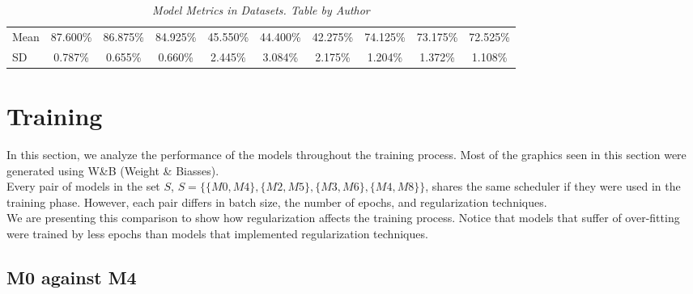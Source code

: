 \begin{landscape}
\begin{table}
\begin{tabular}{lccccccccc}
\cellcolor{gray!50}Mean & \cellcolor{gray!50}87.600\% & \cellcolor{gray!50}86.875\% & \cellcolor{gray!50}84.925\% & \cellcolor{gray!50}45.550\% & \cellcolor{gray!50}44.400\% & \cellcolor{gray!50}42.275\% & \cellcolor{gray!50}74.125\% & \cellcolor{gray!50}73.175\% & \cellcolor{gray!50}72.525\% \\
\cellcolor{gray!50}SD & \cellcolor{gray!50}0.787\% & \cellcolor{gray!50}0.655\% & \cellcolor{gray!50}0.660\% & \cellcolor{gray!50}2.445\% & \cellcolor{gray!50}3.084\% & \cellcolor{gray!50}2.175\% & \cellcolor{gray!50}1.204\% & \cellcolor{gray!50}1.372\% &  \cellcolor{gray!50}1.108\% \\

\bottomrule
\end{tabular}
\caption[Model Metrics in Datasets]
  {\textit{Model Metrics in Datasets. Table by Author}}
{\label{table:resume-metrics}}
\end{table}

\end{landscape}


\section{Training}

In this section, we analyze the performance of the models throughout the training process.
Most of the graphics seen in this section were generated using W\&B (Weight \& Biasses).\\


Every pair of models in the set \(S\), \(S=\{\{M0, M4\}, \{M2, M5\}, \{M3, M6\}, \{M4, M8\}\}\),
shares the same scheduler if they were used in the training phase.
However, each pair differs in batch size, the number of epochs, and regularization techniques. \\

We are presenting this comparison to show how regularization affects the training process. Notice that models that suffer of over-fitting were trained by less epochs than models
that implemented regularization techniques.

\subsection{M0 against M4}

